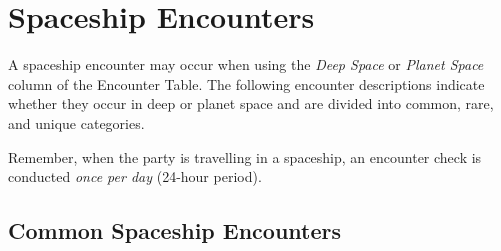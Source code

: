 \hrulefill

\section{Spaceship Encounters}
\label{sec:spaceship-encounters}

A spaceship encounter may occur when using the \emph{Deep Space} or
\emph{Planet Space} column of the Encounter Table. The following
encounter descriptions indicate whether they occur in deep or planet
space and are divided into common, rare, and unique categories.

Remember, when the party is travelling in a spaceship, an encounter
check is conducted \emph{once per day} (24-hour period).


\subsection{Common Spaceship Encounters}
\label{sec:comm-spac-enco}

